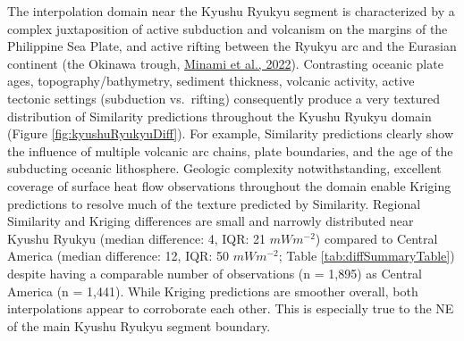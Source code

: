 The interpolation domain near the Kyushu Ryukyu segment is characterized by a complex juxtaposition of active subduction and volcanism on the margins of the Philippine Sea Plate, and active rifting between the Ryukyu arc and the Eurasian continent (the Okinawa trough, \protect\hyperlink{ref-minami2022}{Minami et al., 2022}). Contrasting oceanic plate ages, topography/bathymetry, sediment thickness, volcanic activity, active tectonic settings (subduction vs.~rifting) consequently produce a very textured distribution of Similarity predictions throughout the Kyushu Ryukyu domain (Figure \ref{fig:kyushuRyukyuDiff}). For example, Similarity predictions clearly show the influence of multiple volcanic arc chains, plate boundaries, and the age of the subducting oceanic lithosphere. Geologic complexity notwithstanding, excellent coverage of surface heat flow observations throughout the domain enable Kriging predictions to resolve much of the texture predicted by Similarity. Regional Similarity and Kriging differences are small and narrowly distributed near Kyushu Ryukyu (median difference: 4, IQR: 21 \(mWm^{-2}\)) compared to Central America (median difference: 12, IQR: 50 \(mWm^{-2}\); Table \ref{tab:diffSummaryTable}) despite having a comparable number of observations (n = 1,895) as Central America (n = 1,441). While Kriging predictions are smoother overall, both interpolations appear to corroborate each other. This is especially true to the NE of the main Kyushu Ryukyu segment boundary.



